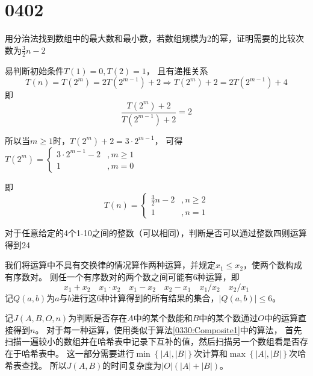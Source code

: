 \section{0402}\label{sec:0402}
\begin{questions}

    \question 用分治法找到数组中的最大数和最小数，若数组规模为2的幂，证明需要的比较次数为$\frac{3}{2} n -2$
    \begin{solution}
        易判断初始条件$T(1) = 0, T(2) = 1$，
        且有递推关系
        \[ T(n) = T(2^m) = 2T(2^{m-1}) + 2 \Rightarrow T(2^m) + 2 = 2T(2^{m-1}) + 4 \]
        即
        \[ \frac{T(2^m) + 2}{T(2^{m-1}) + 2} = 2 \]

        所以当$m \ge 1$时，$T(2^m) + 2 = 3 \cdot 2^{m-1}$，
        可得$T(2^m) = \begin{cases}
                3 \cdot 2^{m-1} - 2 & , m \ge 1 \\
                1                   & , m = 0
            \end{cases}
        $

        即
        \[
            T(n) = \begin{cases}
                \frac{3}{2} n - 2 & , n \ge 2 \\
                1                 & , n = 1
            \end{cases}
        \]
    \end{solution}

    \question 对于任意给定的4个1-10之间的整数（可以相同），判断是否可以通过整数四则运算得到24
    \begin{solution}
        我们将运算中不具有交换律的情况算作两种运算，并规定$x_1 \leq x_2$，使两个数构成有序数对。
        则任一个有序数对的两个数之间可能有$6$种运算，即 \[
            x_1 + x_2 \quad x_1 \cdot x_2 \quad x_1 - x_2 \quad x_2 - x_1 \quad x_1 / x_2 \quad x_2 / x_1
        \]
        记$Q(a,b)$为$a$与$b$进行这$6$种计算得到的所有结果的集合，$|Q(a,b)| \le 6$。

        记$J(A,B,O,n)$为判断是否存在$A$中的某个数能和$B$中的某个数通过$O$中的运算直接得到$n$。
        对于每一种运算，使用类似于算法\ref{0330:Composite1}中的算法，
        首先扫描一遍较小的数组并在哈希表中记录下互补的值，然后扫描另一个数组看是否存在于哈希表中。
        这一部分需要进行$\min\left\{ |A|, |B| \right\}$次计算和$\max\left\{ |A|, |B| \right\}$次哈希表查找。
        所以$J(A,B)$的时间复杂度为$|O|(|A| + |B|)$。


\end{solution}
\end{questions}
